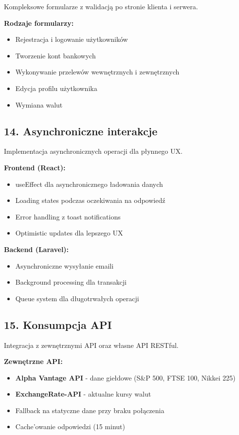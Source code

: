 \documentclass[12pt,a4paper]{article}
\begin{document}
    Kompleksowe formularze z walidacją po stronie klienta i serwera.

    \textbf{Rodzaje formularzy:}
    \begin{itemize}
        \item Rejestracja i logowanie użytkowników
        \item Tworzenie kont bankowych
        \item Wykonywanie przelewów wewnętrznych i zewnętrznych
        \item Edycja profilu użytkownika
        \item Wymiana walut
    \end{itemize}

    \subsection{14. Asynchroniczne interakcje}

    Implementacja asynchronicznych operacji dla płynnego UX.

    \textbf{Frontend (React):}
    \begin{itemize}
        \item useEffect dla asynchronicznego ładowania danych
        \item Loading states podczas oczekiwania na odpowiedź
        \item Error handling z toast notifications
        \item Optimistic updates dla lepszego UX
    \end{itemize}

    \textbf{Backend (Laravel):}
    \begin{itemize}
        \item Asynchroniczne wysyłanie emaili
        \item Background processing dla transakcji
        \item Queue system dla długotrwałych operacji
    \end{itemize}

    \subsection{15. Konsumpcja API}

    Integracja z zewnętrznymi API oraz własne API RESTful.

    \textbf{Zewnętrzne API:}
    \begin{itemize}
        \item \textbf{Alpha Vantage API} - dane giełdowe (S\&P 500, FTSE 100, Nikkei 225)
        \item \textbf{ExchangeRate-API} - aktualne kursy walut
        \item Fallback na statyczne dane przy braku połączenia
        \item Cache'owanie odpowiedzi (15 minut)
    \end{itemize}
\end{document}
